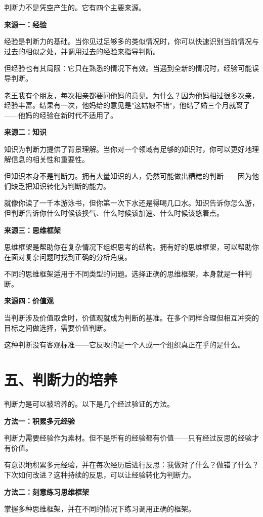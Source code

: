 判断力不是凭空产生的。它有四个主要来源。

\textbf{来源一：经验}

经验是判断力的基础。当你见过足够多的类似情况时，你可以快速识别当前情况与过去的相似之处，并调用过去的经验来指导判断。

但经验也有其局限：它只在熟悉的情况下有效。当遇到全新的情况时，经验可能误导判断。

老王我有个朋友，每次相亲都要问他妈的意见。为什么？因为他妈相过很多次亲，经验丰富。结果有一次，他妈给的意见是"这姑娘不错"，他结了婚三个月就离了——他妈的经验在新时代不适用了。

\textbf{来源二：知识}

知识为判断力提供了背景理解。当你对一个领域有足够的知识时，你可以更好地理解信息的相关性和重要性。

但知识本身不是判断力。拥有大量知识的人，仍然可能做出糟糕的判断——因为他们缺乏把知识转化为判断的能力。

就像你读了一千本游泳书，但你第一次下水还是得喝几口水。知识告诉你怎么游，但判断告诉你什么时候该换气、什么时候该加速、什么时候该悠着点。

\textbf{来源三：思维框架}

思维框架是帮助你在复杂情况下组织思考的结构。拥有好的思维框架，可以帮助你在面对复杂问题时找到正确的分析角度。

不同的思维框架适用于不同类型的问题。选择正确的思维框架，本身就是一种判断。

\textbf{来源四：价值观}

当判断涉及价值取舍时，价值观就成为判断的基准。在多个同样合理但相互冲突的目标之间做选择，需要价值判断。

这种判断没有客观标准——它反映的是一个人或一个组织真正在乎的是什么。

\section{五、判断力的培养}


判断力是可以被培养的。以下是几个经过验证的方法。

\textbf{方法一：积累多元经验}

判断力需要经验作为素材。但不是所有的经验都有价值——只有经过反思的经验才有价值。

有意识地积累多元经验，并在每次经历后进行反思：我做对了什么？做错了什么？下次如何改进？这种持续的反思，可以让经验转化为判断力。

\textbf{方法二：刻意练习思维框架}

掌握多种思维框架，并在不同的情况下练习调用正确的框架。

